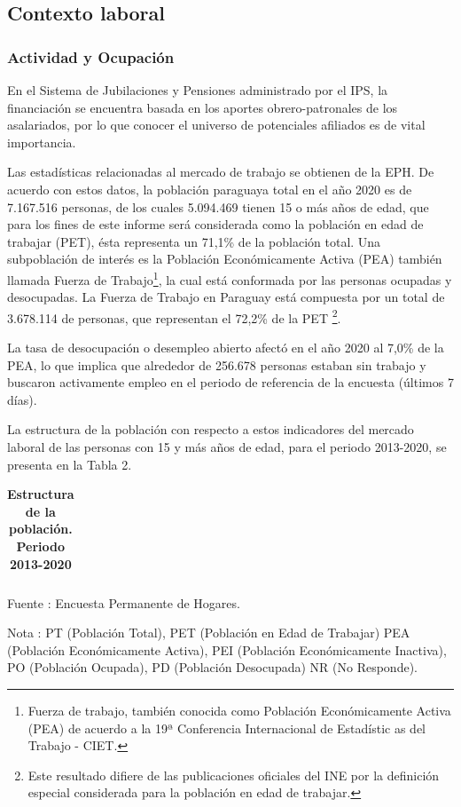 \newpage

\subsection{Contexto laboral}\subsubsection{Actividad y Ocupación}

En el Sistema de Jubilaciones y Pensiones administrado por el IPS, la
financiación se encuentra basada en los aportes obrero-patronales de los
asalariados, por lo que conocer el universo de potenciales afiliados es
de vital importancia.

Las estadísticas relacionadas al mercado de trabajo se obtienen de la
EPH. De acuerdo con estos datos, la población paraguaya total en el año
2020 es de 7.167.516 personas, de los cuales 5.094.469 tienen 15 o más
años de edad, que para los fines de este informe será considerada como
la población en edad de trabajar (PET), ésta representa un 71,1\% de la
población total. Una subpoblación de interés es la Población
Económicamente Activa (PEA) también llamada Fuerza de
Trabajo\footnote{Fuerza de trabajo, también conocida como Población Económicamente Activa (PEA) de acuerdo a la 19ª Conferencia Internacional de Estadístic
as del Trabajo - CIET.}, la cual está conformada por las personas
ocupadas y desocupadas. La Fuerza de Trabajo en Paraguay está compuesta
por un total de 3.678.114 de personas, que representan el 72,2\% de la
PET \footnote{Este resultado difiere de las 
publicaciones oficiales del INE por la definición especial considerada para la población en edad de trabajar.}.

La tasa de desocupación o desempleo abierto afectó en el año 2020 al
7,0\% de la PEA, lo que implica que alrededor de 256.678 personas
estaban sin trabajo y buscaron activamente empleo en el periodo de
referencia de la encuesta (últimos 7 días).

La estructura de la población con respecto a estos indicadores del
mercado laboral de las personas con 15 y más años de edad, para el
periodo 2013-2020, se presenta en la Tabla 2.

\begin{table}[H]
\begin{center}
\footnotesize
\caption{\bf{Estructura de la población. Periodo 2013-2020}}
\begin{tabular}{l|rrrrrr}

\end{tabular}
                    \item \footnotesize Fuente : Encuesta Permanente de Hogares. 
                    \item \footnotesize Nota : PT (Población Total), PET (Población en Edad de Trabajar) PEA (Población Económicamente Activa), PEI (Población Económicamente Inactiva), PO (Población Ocupada), PD (Población Desocupada) NR (No Responde). 
\end{center}
\end{table}

